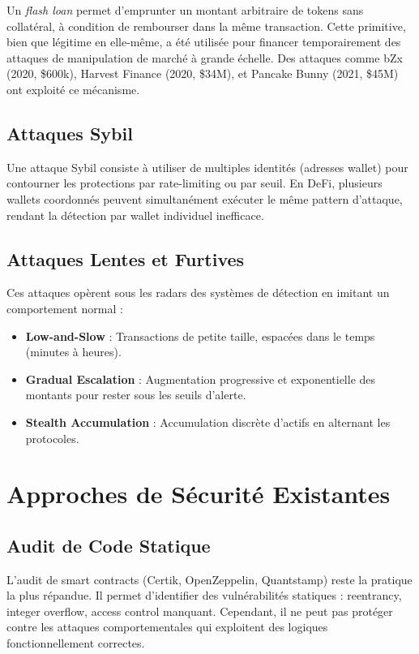 \documentclass[12pt,a4paper]{report}
\begin{document}
Un \textit{flash loan} permet d'emprunter un montant arbitraire de tokens sans collatéral, à condition de rembourser dans la même transaction. Cette primitive, bien que légitime en elle-même, a été utilisée pour financer temporairement des attaques de manipulation de marché à grande échelle. Des attaques comme bZx (2020, \$600k), Harvest Finance (2020, \$34M), et Pancake Bunny (2021, \$45M) ont exploité ce mécanisme.

\subsection{Attaques Sybil}

Une attaque Sybil consiste à utiliser de multiples identités (adresses wallet) pour contourner les protections par rate-limiting ou par seuil. En DeFi, plusieurs wallets coordonnés peuvent simultanément exécuter le même pattern d'attaque, rendant la détection par wallet individuel inefficace.

\subsection{Attaques Lentes et Furtives}

Ces attaques opèrent sous les radars des systèmes de détection en imitant un comportement normal :
\begin{itemize}
  \item \textbf{Low-and-Slow} : Transactions de petite taille, espacées dans le temps (minutes à heures).
  \item \textbf{Gradual Escalation} : Augmentation progressive et exponentielle des montants pour rester sous les seuils d'alerte.
  \item \textbf{Stealth Accumulation} : Accumulation discrète d'actifs en alternant les protocoles.
\end{itemize}

\section{Approches de Sécurité Existantes}

\subsection{Audit de Code Statique}

L'audit de smart contracts (Certik, OpenZeppelin, Quantstamp) reste la pratique la plus répandue. Il permet d'identifier des vulnérabilités statiques : reentrancy, integer overflow, access control manquant. Cependant, il ne peut pas protéger contre les attaques comportementales qui exploitent des logiques fonctionnellement correctes.
\end{document}
